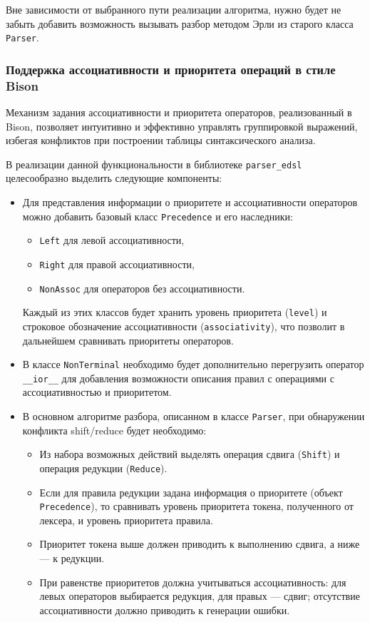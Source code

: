 \documentclass[14pt, russian]{scrartcl}
\begin{document}
Вне зависимости от выбранного пути реализации алгоритма, нужно будет не забыть добавить возможность вызывать разбор
методом Эрли из старого класса \texttt{Parser}.

\subsubsection{Поддержка ассоциативности и приоритета операций в стиле Bison}

Механизм задания ассоциативности и приоритета операторов, реализованный в Bison, позволяет интуитивно и
эффективно управлять группировкой выражений, избегая конфликтов при построении таблицы синтаксического анализа.

В реализации данной функциональности в библиотеке \texttt{parser\_edsl} целесообразно выделить следующие компоненты:

\begin{itemize}
	\item Для представления информации о приоритете и ассоциативности операторов можно добавить базовый класс
	\texttt{Precedence} и его наследники:
	\begin{itemize}
		\item \texttt{Left} для левой ассоциативности,
		\item \texttt{Right} для правой ассоциативности,
		\item \texttt{NonAssoc} для операторов без ассоциативности.
	\end{itemize}
	Каждый из этих классов будет хранить уровень приоритета (\texttt{level}) и строковое обозначение
	ассоциативности (\texttt{associativity}), что позволит в дальнейшем сравнивать приоритеты операторов.
	\item В классе \texttt{NonTerminal} необходимо будет дополнительно перегрузить оператор \verb|__ior__| для добавления
	возможности описания правил с операциями с ассоциативностью и приоритетом.
	\item В основном алгоритме разбора, описанном в классе \texttt{Parser}, при обнаружении конфликта
	shift/reduce будет необходимо:
	\begin{itemize}
		\item Из набора возможных действий выделять операция сдвига (\texttt{Shift}) и операция редукции
		(\texttt{Reduce}).
		\item Если для правила редукции задана информация о приоритете (объект \texttt{Precedence}),
		то сравнивать уровень приоритета токена, полученного от лексера, и уровень приоритета правила.
		\item Приоритет токена выше должен приводить к выполнению сдвига, а ниже --- к редукции.
		\item При равенстве приоритетов должна учитываться ассоциативность: для левых операторов выбирается редукция,
		 для правых --- сдвиг; отсутствие ассоциативности должно приводить к генерации ошибки.
	\end{itemize}
\end{itemize}
\end{document}
